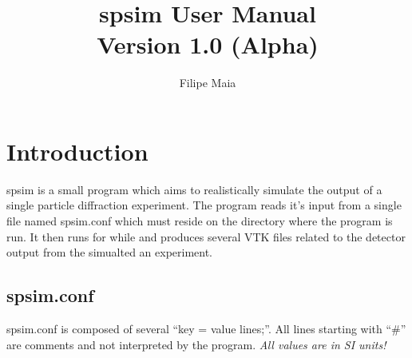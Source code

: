 \documentclass{report}
\begin{document}
\title{{\textbf{spsim}}
\vspace {1.0in}
{User Manual} \\ Version 1.0 (Alpha) }
\author {Filipe Maia}

\maketitle

\parindent=0pt 
\baselineskip=18pt 
\lineskip=0pt

\tableofcontents

\pagestyle{headings}

\def\delfo{$\delta_{fo}$~}
\def\delfc{$\delta_{fc}$~}
\def\qq{\qquad\qquad}
\def\hbar{\overline{h}}



\chapter{Introduction} 
\label{intro}

\vspace {0.1in}

spsim is a small program which aims to realistically simulate the output of a single
particle diffraction experiment.
The program reads it's input from a single file named spsim.conf which must reside
on the directory where the program is run.
It then runs for while and produces several VTK files related to the detector output
from the simualted an experiment.

\section{spsim.conf}
\label{tutorial}


spsim.conf is composed of several ``key = value lines;''.
All lines starting with ``\#'' are comments and not interpreted by the program.
{\em All values are in SI units!}
\end{document}

